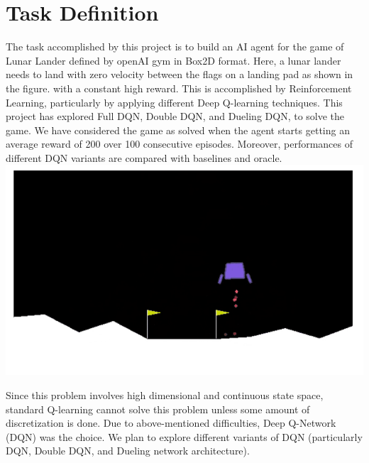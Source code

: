 \section{Task Definition}
\label{intro}

The task accomplished by this project is to build an AI agent for the game of Lunar Lander defined by openAI gym in Box2D format. Here, a lunar lander needs to land with zero velocity between the flags on a landing pad as shown in the figure. with a constant high reward. This is accomplished by Reinforcement Learning, particularly by applying different Deep Q-learning techniques. This project has explored Full DQN, Double DQN, and Dueling DQN, to solve the game. We have considered the game as solved when the agent starts getting an average reward of 200 over 100 consecutive episodes. Moreover, performances of different DQN variants are compared with baselines and oracle. \\

\includegraphics[scale=1.0,width=1.0\columnwidth]{figures/game.png}%

Since this problem involves high dimensional and continuous state
space, standard Q-learning cannot solve this problem unless some amount of discretization is done. Due to above-mentioned difficulties, Deep Q-Network (DQN) was the choice. We plan to explore different variants of DQN (particularly DQN, Double DQN, and
Dueling network architecture).



